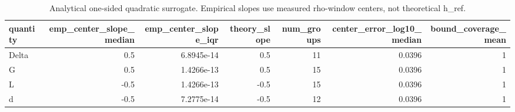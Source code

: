 \begin{table}[t]
\centering
\begin{tabular}{lrrrrrr}
\toprule
quantity & emp\_center\_slope\_median & emp\_center\_slope\_iqr & theory\_slope & num\_groups & center\_error\_log10\_median & bound\_coverage\_mean \\
\midrule
Delta & 0.5 & 6.8945e-14 & 0.5 & 11 & 0.0396 & 1 \\
G & 0.5 & 1.4266e-13 & 0.5 & 15 & 0.0396 & 1 \\
L & -0.5 & 1.4266e-13 & -0.5 & 15 & 0.0396 & 1 \\
d & -0.5 & 7.2775e-14 & -0.5 & 12 & 0.0396 & 1 \\
\bottomrule
\end{tabular}

\caption{Analytical one-sided quadratic surrogate. Empirical slopes use measured rho-window centers, not theoretical h_ref.}
\label{tab:analytic_window_final}
\end{table}
